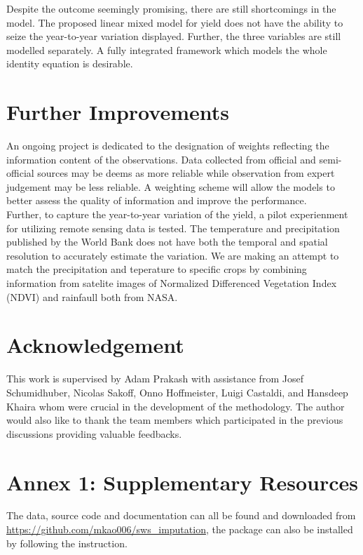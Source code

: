 \documentclass[nojss]{jss}\usepackage[]{graphicx}\usepackage[]{color}
\begin{document}
Despite the outcome seemingly promising, there are still shortcomings
in the model. The proposed linear mixed model for yield does not have
the ability to seize the year-to-year variation displayed. Further,
the three variables are still modelled separately. A fully integrated
framework which models the whole identity equation is desirable.


\section{Further Improvements}
An ongoing project is dedicated to the designation of weights
reflecting the information content of the observations. Data collected
from official and semi-official sources may be deems as more reliable
while observation from expert judgement may be less reliable. A
weighting scheme will allow the models to better assess the quality of
information and improve the performance.\\

Further, to capture the year-to-year variation of the yield, a pilot
experienment for utilizing remote sensing data is tested. The
temperature and precipitation published by the World Bank does not
have both the temporal and spatial resolution to accurately estimate
the variation. We are making an attempt to match the precipitation and
teperature to specific crops by combining information from satelite
images of Normalized Differenced Vegetation Index (NDVI) and rainfaull
both from NASA.


\section*{Acknowledgement}
This work is supervised by Adam Prakash with assistance from Josef
Schumidhuber, Nicolas Sakoff, Onno Hoffmeister, Luigi Castaldi, and
Hansdeep Khaira whom were crucial in the development of the
methodology. The author would also like to thank the team members
which participated in the previous discussions providing valuable
feedbacks.

\section*{Annex 1: Supplementary Resources}

The data, source code and documentation can all be found and
downloaded from \url{https://github.com/mkao006/sws_imputation}, the
package can also be installed by following the instruction. 
\end{document}
